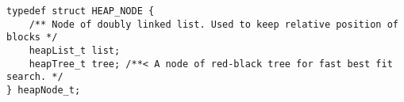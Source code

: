 \documentclass[11pt]{report}
\begin{document}
    \begin{lstlisting}[style=CStyle,label={lst:test_block}]
typedef struct HEAP_NODE {
    /** Node of doubly linked list. Used to keep relative position of blocks */
    heapList_t list;
    heapTree_t tree; /**< A node of red-black tree for fast best fit search. */
} heapNode_t;
    \end{lstlisting}
\end{document}

